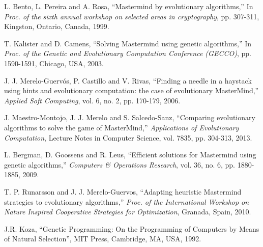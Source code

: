 \begin{thebibliography}{1}
L. Bento, L. Pereira and A. Rosa, ``Mastermind by evolutionary algorithms,'' In {\em Proc. of the sixth annual workshop on selected areas in cryptography}, pp. 307-311, Kingston, Ontario, Canada, 1999.

T. Kalister and D. Camens, ``Solving Mastermind using genetic algorithms,'' In {\em Proc. of the Genetic and Evolutionary Computation Conference (GECCO)}, pp. 1590-1591, Chicago, USA, 2003.

J. J. Merelo-Guerv\'os, P. Castillo and V. Rivas, ``Finding a needle in a haystack using hints and evolutionary computation: the case of evolutionary MasterMind,'' {\em Applied Soft Computing}, vol. 6, no. 2, pp. 170-179, 2006.

J. Maestro-Montojo, J. J. Merelo and S. Salcedo-Sanz,
``Comparing evolutionary algorithms to solve the game of MasterMind,''
{\em Applications of Evolutionary Computation},
Lecture Notes in Computer Science, vol. 7835, pp. 304-313, 2013.   


L. Bergman, D. Goossens and R. Leus, ``Efficient solutions for Mastermind using genetic algorithms,'' {\em Computers \& Operations Research}, vol. 36, no. 6, pp. 1880-1885, 2009.

T. P. Runarsson and J. J. Merelo-Guervos,
``Adapting heuristic Mastermind strategies to evolutionary algorithms,''
{\em Proc. of the International Workshop on Nature Inspired Cooperative Strategies for Optimization}, Granada, Spain, 2010.

%



J.R. Koza, ``Genetic Programming: On the Programming of Computers by Means of Natural Selection'', MIT Press, Cambridge, MA, USA, 1992.


\end{thebibliography}
